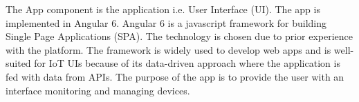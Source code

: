 The App component is the application i.e. User Interface (UI). The app is implemented in Angular 6. Angular 6 is a javascript framework for building Single Page Applications (SPA). The technology is chosen due to prior experience with the platform. The framework is widely used to develop web apps and is well-suited for IoT UIs because of its data-driven approach where the application is fed with data from APIs. The purpose of the app is to provide the user with an interface monitoring and  managing devices.